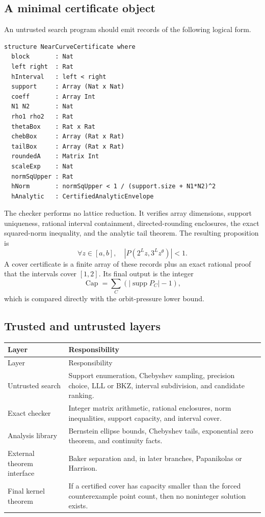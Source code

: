 \documentclass[11pt,oneside]{article}
\theoremstyle{definition}
\theoremstyle{remark}
\newcommand{\supp}{\operatorname{supp}}
\newcommand{\tht}{\theta}
\begin{document}
\subsection{A minimal certificate object}

An untrusted search program should emit records of the following logical form.

\begin{lstlisting}[style=pseudostyle]
structure NearCurveCertificate where
  block       : Nat
  left right  : Rat
  hInterval   : left < right
  support     : Array (Nat x Nat)
  coeff       : Array Int
  N1 N2       : Nat
  rho1 rho2   : Rat
  thetaBox    : Rat x Rat
  chebBox     : Array (Rat x Rat)
  tailBox     : Array (Rat x Rat)
  roundedA    : Matrix Int
  scaleExp    : Nat
  normSqUpper : Rat
  hNorm       : normSqUpper < 1 / (support.size + N1*N2)^2
  hAnalytic   : CertifiedAnalyticEnvelope
\end{lstlisting}

The checker performs no lattice reduction.  It verifies array dimensions, support uniqueness,
rational interval containment, directed-rounding enclosures, the exact squared-norm inequality,
and the analytic tail theorem.  The resulting proposition is
\[
  \forall z\in[a,b],\quad
  |P(2^Lz,3^Lz^{\tht})|<1.
\]
A cover certificate is a finite array of these records plus an exact rational proof that the
intervals cover $[1,2]$.  Its final output is the integer
\[
  \operatorname{Cap}=\sum_C(|\supp P_C|-1),
\]
which is compared directly with the orbit-pressure lower bound.

\subsection{Trusted and untrusted layers}

\begin{longtable}{L{0.22\textwidth}L{0.70\textwidth}}
\toprule
Layer & Responsibility \\
\midrule
\endfirsthead
\toprule
Layer & Responsibility \\
\midrule
\endhead
Untrusted search & Support enumeration, Chebyshev sampling, precision choice, LLL or BKZ, interval subdivision, and candidate ranking. \\
Exact checker & Integer matrix arithmetic, rational enclosures, norm inequalities, support capacity, and interval cover. \\
Analysis library & Bernstein ellipse bounds, Chebyshev tails, exponential zero theorem, and continuity facts. \\
External theorem interface & Baker separation and, in later branches, Papanikolas or Harrison. \\
Final kernel theorem & If a certified cover has capacity smaller than the forced counterexample point count, then no noninteger solution exists. \\
\bottomrule
\end{longtable}
\end{document}
